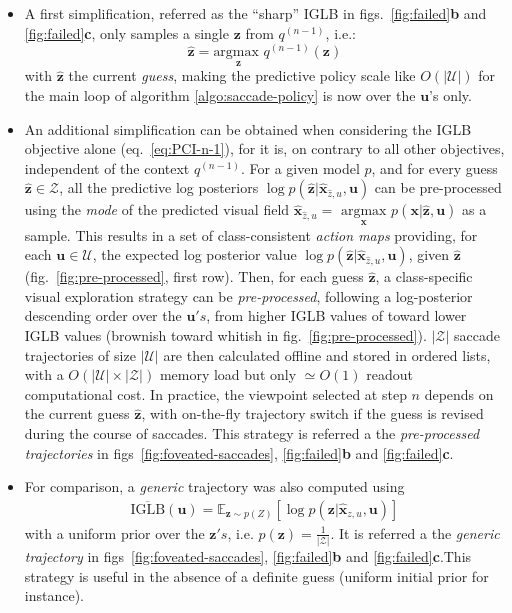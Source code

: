 \documentclass[12pt,twoside,openright]{article}
\begin{document}
\begin{itemize}
	\item A first simplification, referred as the ``sharp'' IGLB in  figs.~\ref{fig:failed}\textbf{b} and \ref{fig:failed}\textbf{c}, only samples a single $\boldsymbol{z}$ from $q^{(n-1)}$, i.e.: 
	$$ \hat{\boldsymbol{z}} = \underset{\boldsymbol{z}}{\text{argmax }} q^{(n-1)}(\boldsymbol{z})$$
	with $\hat{\boldsymbol{z}}$ the current \emph{guess}, making the predictive policy scale like $O(|\mathcal{U}|)$ for the main loop of algorithm \ref{algo:saccade-policy} is now over the $\boldsymbol{u}$'s only. 
	\item An additional simplification can be obtained when considering the IGLB objective alone (eq.~\ref{eq:PCI-n-1}), for it is, on contrary to all other objectives, independent of the context $q^{(n-1)}$. For a given model $p$, and for every guess $\hat{\boldsymbol{z}} \in \mathcal{Z}$, all the predictive log posteriors $\log p(\hat{\boldsymbol{z}}|\hat{\boldsymbol{x}}_{\hat{z},u}, \boldsymbol{u})$ can be pre-processed using the \emph{mode} of the predicted visual field $\hat{\boldsymbol{x}}_{\hat{z},u} = \underset{\boldsymbol{x}}{\text{ argmax }} p(\boldsymbol{x}|\hat{\boldsymbol{z}}, \boldsymbol{u})$ as a sample. This results in a set of class-consistent \emph{action maps} providing, for each $\boldsymbol{u} \in \mathcal{U}$, the expected log posterior value $\log p(\hat{\boldsymbol{z}}|\hat{\boldsymbol{x}}_{\hat{z},u}, \boldsymbol{u})$, given $\hat{\boldsymbol{z}}$ (fig.~\ref{fig:pre-processed}, first row). Then, for each guess $\hat{\boldsymbol{z}}$,  a class-specific visual exploration strategy can be \emph{pre-processed}, following a log-posterior descending order over the $\boldsymbol{u}'s$,  from higher IGLB values of toward lower IGLB values (brownish toward whitish in fig.~\ref{fig:pre-processed}).  $|\mathcal{Z}|$ saccade trajectories of size $|\mathcal{U}|$ are then calculated offline and stored  in ordered lists, with a $O(|\mathcal{U}|\times|\mathcal{Z}|)$ memory load but only $\simeq O(1)$ readout computational cost. 
	In practice, the viewpoint selected at step $n$ depends on the current guess $\hat{\boldsymbol{z}}$, with on-the-fly trajectory switch if the guess is revised during the course of saccades. This strategy is referred a the \emph{pre-processed trajectories} in figs~\ref{fig:foveated-saccades}, \ref{fig:failed}\textbf{b} and \ref{fig:failed}\textbf{c}. 
	\item For comparison, a \emph{generic} trajectory was also computed using \begin{align}
	\overline{\text{IGLB}}(\boldsymbol{u})
	= \mathbb{E}_{\boldsymbol{z} \sim p(Z)}\left[ \log p(\boldsymbol{z}|\hat{\boldsymbol{x}}_{z,u}, \boldsymbol{u})\right]
	\end{align} with a uniform prior over the $\boldsymbol{z}'s$, i.e. $p(\boldsymbol{z}) = \frac{1}{|\mathcal{Z}|}$.
	It is referred a the \emph{generic trajectory} in figs~\ref{fig:foveated-saccades}, \ref{fig:failed}\textbf{b} and \ref{fig:failed}\textbf{c}.This strategy is useful in the absence of a definite guess (uniform initial prior for instance).
\end{itemize}
\end{document}
